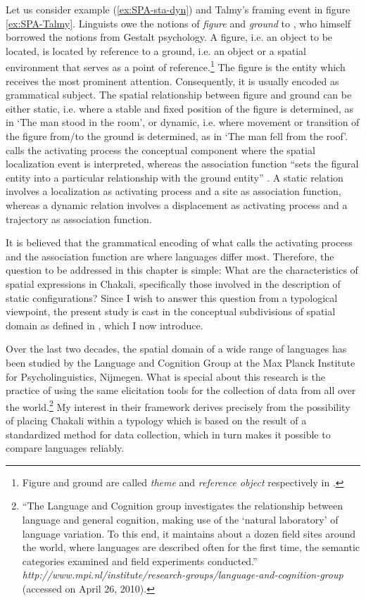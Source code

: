 Let us
consider example (\ref{ex:SPA-sta-dyn}) and Talmy's framing event  in
figure \ref{ex:SPA-Talmy}. 
Linguists owe the notions of  \textit{figure} and \textit{ground} to
\citet[232]{Talm83}, who himself borrowed the notions from Gestalt psychology. A
 figure, i.e. an object to be located, is located  by reference to  a ground,
i.e. an object or a spatial environment that serves as a point of
reference.\footnote{Figure and ground are  called {\it theme} and {\it reference
object} respectively in \cite{Jack83}.}  The figure is the entity which receives
the most prominent attention. Consequently, it is usually encoded as 
grammatical
subject.     The spatial relationship between figure and
ground can be either
static, i.e. where a stable and fixed position of the figure is determined,  as
in
`The man stood in the room', or dynamic, i.e.  where movement or transition of
the figure from/to the ground is determined,  as in `The man fell from the
roof'. 
\citeauthor{Talm00a} calls the activating process  the
conceptual component
where the spatial localization event is interpreted, whereas the association
function ``sets the figural entity into a particular relationship with the
ground entity'' \citep[218]{Talm00b}.  A static
relation involves a localization as
activating process and a site as association function, whereas a dynamic
relation   involves  a displacement  as  activating process and a trajectory  as
association function. 

It is believed that the grammatical encoding of what \citeauthor{Talm00a} calls
the activating process and the association function  are where languages differ
  most.   Therefore, the question to be addressed in this chapter is simple:
What are the characteristics of spatial expressions in Chakali, specifically
those involved in the description of static configurations? Since I wish to
answer this question from a typological viewpoint, the present study is  cast
in the conceptual subdivisions of spatial domain as defined in \citet{Levi06},
which I now introduce.

Over the last two decades, the spatial domain of a wide range of languages has
been studied by the Language and Cognition Group at the Max Planck Institute for
Psycholinguistics, Nijmegen. What is special about this research is the
practice of using
the same elicitation tools for the collection of data from all over the
world.\footnote{``The Language and Cognition group investigates the relationship
between language and general cognition, making use of the `natural laboratory'
of language variation. To this end, it maintains about a dozen field sites
around the world, where languages are described often for the first time, the
semantic categories examined and field experiments conducted.'' \\ {\it
http://www.mpi.nl/institute/research-groups/language-and-cognition-group}
(accessed on April 26, 2010).} My interest in their framework derives
precisely 
from the possibility of placing Chakali within a typology which is based on the
result of a standardized method for data collection, which in turn makes it
possible to compare languages reliably. 


